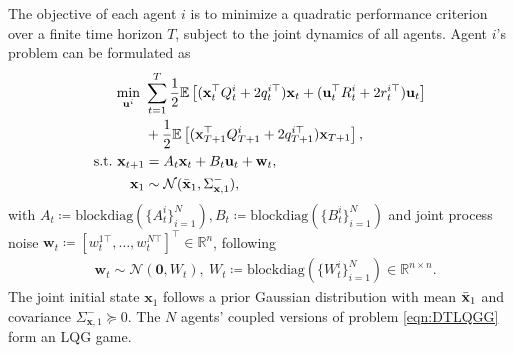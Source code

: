 \documentclass[letterpaper, 10 pt, conference]{ieeeconf}  %
\begin{document}
The objective of each agent $i$ is to minimize a quadratic performance criterion over a finite time horizon $T$, subject to the joint dynamics of all agents. Agent $i$'s problem can be formulated as
\begin{subequations}
    \begin{align}
        \min_{\textbf{u}^i}\ &\sum_{t=1}^T\frac{1}{2}\mathbb{E}\left[(\textbf{x}_t^\top Q_t^i+2q_t^{i\top})\textbf{x}_t+(\textbf{u}_t^{\top}R_t^i+2r_t^{i\top})\textbf{u}_t\right]\notag\\
        &+\frac{1}{2}\mathbb{E}\left[(\textbf{x}_{T+1}^\top Q_{T+1}^i+2q_{T+1}^{i\top})\textbf{x}_{T+1}\right],\label{eqn:lqgg_cost}\\
        \text{s.t.}\  \textbf{x}_{t+1}&=A_t\textbf{x}_t+B_t\textbf{u}_t+\textbf{w}_t,\label{eqn:lqgg_dyn}\\
        \textbf{x}_1&\sim\mathcal{N}(\Bar{\textbf{x}}_1,\Sigma_{\textbf{x},1}^-),\label{eqn:lqgg_initial_cond}
    \end{align}
    \label{eqn:DTLQGG}%
\end{subequations}
with $A_t\coloneqq\text{blockdiag}(\{A_t^i\}_{i=1}^N),B_t\coloneqq\text{blockdiag}(\{B_t^i\}_{i=1}^N)$ and joint process noise $\textbf{w}_t\coloneqq[w_t^{1\top},\dots,w_t^{N\top}]^\top\in\mathbb{R}^n$, following
\begin{equation*}
    \begin{aligned}
        &\textbf{w}_t\sim\mathcal{N}(\textbf{0},W_t),\ W_t\coloneqq\text{blockdiag}(\{W_t^i\}_{i=1}^N)\in\mathbb{R}^{n\times n}.
    \end{aligned}
\end{equation*}
The joint initial state $\textbf{x}_1$ follows a prior Gaussian distribution with mean ${\Bar{\textbf{x}}_1}$ and covariance ${\Sigma_{\textbf{x},1}^-\succeq0}$.
The $N$ agents' coupled versions of problem \eqref{eqn:DTLQGG} form an LQG game.
\end{document}
